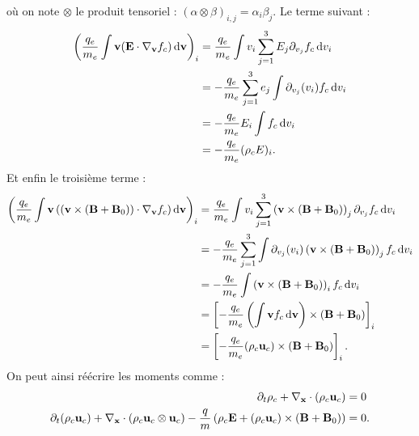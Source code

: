 où on note $\otimes$ le produit tensoriel : $(\alpha\otimes\beta)_{i,j} = \alpha_i\beta_j$. Le terme suivant :
$$
	\begin{aligned}
    \left( \frac{q_e}{m_e}\int\vb{v}(\vb{E}\cdot\nabla_{\vb{v}}f_c)\dd{\vb{v}} \right)_i
    		&= \frac{q_e}{m_e}\int v_i\sum_{j=1}^3 E_j\partial_{v_j}f_c\dd{v_i} \\
				&= -\frac{q_e}{m_e}\sum_{j=1}^3 e_j\int\partial_{v_j}(v_i)f_c\dd{v_i} \\
				&= -\frac{q_e}{m_e}E_i\int f_c\dd{v_i} \\
				&= -\frac{q_e}{m_e}(\rho_c E)_i.
	\end{aligned}
$$
Et enfin le troisième terme :
$$
	\begin{aligned}
    \left( \frac{q_e}{m_e}\int\vb{v}\left((\vb{v}\times(\vb{B}+\vb{B}_0))\cdot\nabla_{\vb{v}}f_c\right)\dd{\vb{v}} \right)_i
    		&= \frac{q_e}{m_e}\int v_i\sum_{j=1}^3\left(\vb{v}\times(\vb{B}+\vb{B}_0)\right)_j\partial_{v_j}f_c\dd{v_i} \\
				&= -\frac{q_e}{m_e}\sum_{j=1}^3\int\partial_{v_j}(v_i)\left(\vb{v}\times(\vb{B}+\vb{B}_0)\right)_jf_c\dd{v_i} \\
				&= -\frac{q_e}{m_e}\int\left(\vb{v}\times(\vb{B}+\vb{B}_0)\right)_i f_c\dd{v_i} \\
				&= \left[ -\frac{q_e}{m_e}\left(\int\vb{v}f_c\dd{\vb{v}}\right)\times(\vb{B}+\vb{B}_0) \right]_i \\
				&= \left[ -\frac{q_e}{m_e}(\rho_c\vb{u}_c)\times(\vb{B}+\vb{B}_0) \right]_i.
	\end{aligned}
$$
On peut ainsi réécrire les moments comme :
$$
  \begin{aligned}
    \partial_t\rho_c + \nabla_{\vb{x}}\cdot(\rho_c\vb{u}_c) &= 0 \\
    \partial_t(\rho_c\vb{u}_c) + \nabla_{\vb{x}}\cdot(\rho_c\vb{u}_c\otimes\vb{u}_c) - \frac{q}{m}\left( \rho_c\vb{E} + (\rho_c\vb{u}_c)\times(\vb{B}+\vb{B}_0) \right) &=0.
  \end{aligned}
$$

